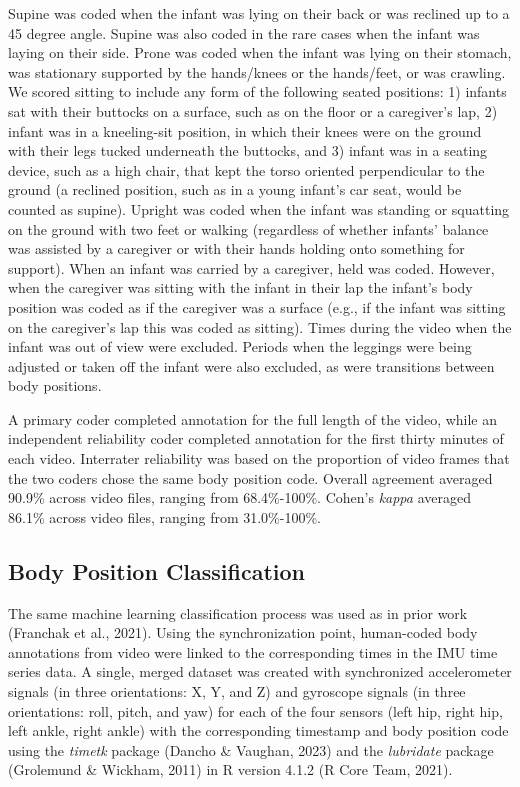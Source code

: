 \documentclass[
  man]{apa6}
\begin{document}
Supine was coded when the infant was lying on their back or was reclined up to a 45 degree angle. Supine was also coded in the rare cases when the infant was laying on their side. Prone was coded when the infant was lying on their stomach, was stationary supported by the hands/knees or the hands/feet, or was crawling. We scored sitting to include any form of the following seated positions: 1) infants sat with their buttocks on a surface, such as on the floor or a caregiver's lap, 2) infant was in a kneeling-sit position, in which their knees were on the ground with their legs tucked underneath the buttocks, and 3) infant was in a seating device, such as a high chair, that kept the torso oriented perpendicular to the ground (a reclined position, such as in a young infant's car seat, would be counted as supine). Upright was coded when the infant was standing or squatting on the ground with two feet or walking (regardless of whether infants' balance was assisted by a caregiver or with their hands holding onto something for support). When an infant was carried by a caregiver, held was coded. However, when the caregiver was sitting with the infant in their lap the infant's body position was coded as if the caregiver was a surface (e.g., if the infant was sitting on the caregiver's lap this was coded as sitting). Times during the video when the infant was out of view were excluded. Periods when the leggings were being adjusted or taken off the infant were also excluded, as were transitions between body positions.

A primary coder completed annotation for the full length of the video, while an independent reliability coder completed annotation for the first thirty minutes of each video. Interrater reliability was based on the proportion of video frames that the two coders chose the same body position code. Overall agreement averaged 90.9\% across video files, ranging from 68.4\%-100\%. Cohen's \emph{kappa} averaged 86.1\% across video files, ranging from 31.0\%-100\%.

\hypertarget{body-position-classification}{%
\subsection{Body Position Classification}\label{body-position-classification}}

The same machine learning classification process was used as in prior work (Franchak et al., 2021). Using the synchronization point, human-coded body annotations from video were linked to the corresponding times in the IMU time series data. A single, merged dataset was created with synchronized accelerometer signals (in three orientations: X, Y, and Z) and gyroscope signals (in three orientations: roll, pitch, and yaw) for each of the four sensors (left hip, right hip, left ankle, right ankle) with the corresponding timestamp and body position code using the \emph{timetk} package (Dancho \& Vaughan, 2023) and the \emph{lubridate} package (Grolemund \& Wickham, 2011) in R version 4.1.2 (R Core Team, 2021).
\end{document}
